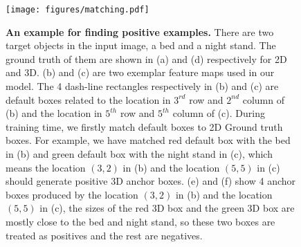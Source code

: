 \documentclass[10pt,twocolumn,letterpaper]{article}
\begin{document}
	\begin{figure}[!ht]
		\centering
		\texttt{[image: figures/matching.pdf]}
		\caption{\textbf{An example for finding positive examples.} There are two target objects in the input image, a bed and a night stand. The ground truth of them are shown in (a) and (d) respectively for 2D and 3D. (b) and (c) are two exemplar feature maps used in our model. The 4 dash-line rectangles respectively in (b) and (c) are default boxes related to the location in $3^{rd}$ row and $2^{nd}$ column of (b) and the location in $5^{th}$ row and $5^{th}$ column of (c). During training time, we firstly match default boxes to 2D Ground truth boxes. For example, we have matched red default box with the bed in (b) and green default box with the night stand in (c), which means the location $(3,2)$ in (b) and the location $(5,5)$ in (c) should generate positive 3D anchor boxes. (e) and (f) show 4 anchor boxes produced by the location $(3,2)$ in (b) and the location $(5,5)$ in (c), the sizes of the red 3D box and the green 3D box are mostly close to the bed and night stand, so these two boxes are treated as positives and the rest are negatives. }
		\label{match}
	\end{figure} 
	
\end{document}
